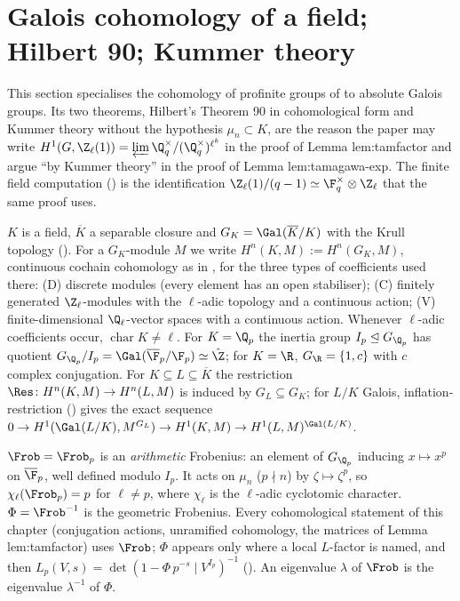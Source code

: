 \section{Galois cohomology of a field; Hilbert 90; Kummer theory}\label{sec:galcoh:field}

This section specialises the cohomology of profinite groups of  to absolute Galois groups. Its two theorems, Hilbert's
Theorem 90 in cohomological form and Kummer theory without the hypothesis $\mu_n\subset K$, are the reason the paper may write
$H^1(G,\Z_\ell(1))=\varprojlim\Q_q^\times/(\Q_q^\times)^{\ell^k}$ in the proof of Lemma lem:tamfactor and argue ``by Kummer theory'' in the proof of
Lemma lem:tamagawa-exp. The finite field computation () is the identification
$\Z_\ell(1)/(q-1)\simeq\F_q^\times\otimes\Z_\ell$ that the same proof uses.

\begin{convention}\label{conv:galcoh:fields}
$K$ is a field, $\overline K$ a separable closure and $G_K=\Gal(\overline K/K)$ with the Krull topology (). For a $G_K$-module $M$ we write
$H^n(K,M):=H^n(G_K,M)$, continuous cochain cohomology as in , for the three types of coefficients used there: (D) discrete modules
(every element has an open stabiliser); (C) finitely generated $\Z_\ell$-modules with the $\ell$-adic topology and a continuous action; (V) finite-dimensional
$\Q_\ell$-vector spaces with a continuous action. Whenever $\ell$-adic coefficients occur, $\operatorname{char}K\ne\ell$. For $K=\Q_p$ the inertia group
$I_p\trianglelefteq G_{\Q_p}$ has quotient $G_{\Q_p}/I_p=\Gal(\overline\F_p/\F_p)\simeq\hat\Z$; for $K=\R$, $G_\R=\{1,c\}$ with $c$ complex conjugation.
For $K\subseteq L\subseteq\overline K$ the restriction $\Res\colon H^n(K,M)\to H^n(L,M)$ is induced by $G_L\subseteq G_K$; for $L/K$ Galois, inflation-restriction
() gives the exact sequence $0\to H^1(\Gal(L/K),M^{G_L})\to H^1(K,M)\to H^1(L,M)^{\Gal(L/K)}$.
\end{convention}

\begin{convention}[Frobenius]\label{conv:galcoh:frobenius}
$\Frob=\Frob_p$ is an \emph{arithmetic} Frobenius: an element of $G_{\Q_p}$ inducing $x\mapsto x^p$ on $\overline\F_p$, well defined modulo $I_p$. It acts on $\mu_n$
($p\nmid n$) by $\zeta\mapsto\zeta^p$, so $\chi_\ell(\Frob_p)=p$ for $\ell\ne p$, where $\chi_\ell$ is the $\ell$-adic cyclotomic character. $\Phi=\Frob^{-1}$ is the
geometric Frobenius. Every cohomological statement of this chapter (conjugation actions, unramified cohomology, the matrices of Lemma lem:tamfactor) uses
$\Frob$; $\Phi$ appears only where a local $L$-factor is named, and then $L_p(V,s)=\det(1-\Phi\,p^{-s}\mid V^{I_p})^{-1}$ (). An eigenvalue
$\lambda$ of $\Frob$ is the eigenvalue $\lambda^{-1}$ of $\Phi$.
\end{convention}

